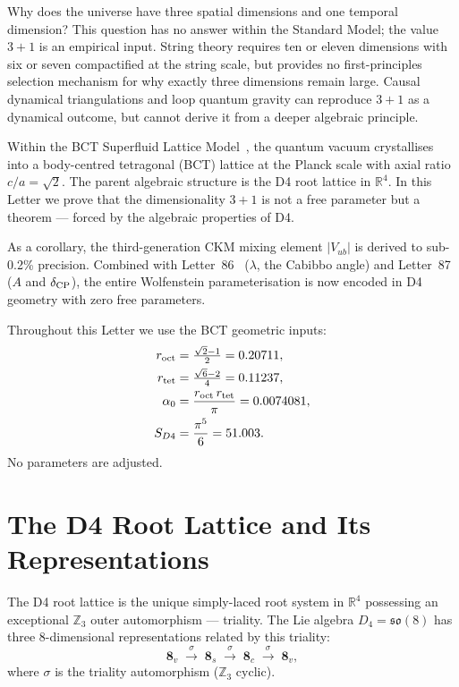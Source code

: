\documentclass[aps,prl,twocolumn,showpacs,superscriptaddress]{revtex4-2}
\begin{document}
Why does the universe have three spatial dimensions and one temporal
dimension? This question has no answer within the Standard Model; the
value $3+1$ is an empirical input. String theory requires ten or eleven
dimensions with six or seven compactified at the string scale, but
provides no first-principles selection mechanism for why exactly three
dimensions remain large. Causal dynamical triangulations and loop
quantum gravity can reproduce $3{+}1$ as a dynamical outcome, but
cannot derive it from a deeper algebraic principle.

Within the BCT Superfluid Lattice Model~\cite{BCT_monograph}, the
quantum vacuum crystallises into a body-centred tetragonal (BCT)
lattice at the Planck scale with axial ratio $c/a = \sqrt{2}$. The
parent algebraic structure is the D4 root lattice in $\mathbb{R}^4$.
In this Letter we prove that the dimensionality $3{+}1$ is not a free
parameter but a theorem --- forced by the algebraic properties of D4.

As a corollary, the third-generation CKM mixing element $|V_{ub}|$ is
derived to sub-0.2\% precision. Combined with Letter~86~\cite{L86}
($\lambda$, the Cabibbo angle) and Letter~87~\cite{L87} ($A$ and
$\delta_{\rm CP}$), the entire Wolfenstein parameterisation is now
encoded in D4 geometry with zero free parameters.

Throughout this Letter we use the BCT geometric inputs:
\begin{align}
  r_{\rm oct} &= \tfrac{\sqrt{2}-1}{2} = 0.20711, \label{eq:roct}\\
  r_{\rm tet} &= \tfrac{\sqrt{6}-2}{4} = 0.11237, \label{eq:rtet}\\
  \alpha_0    &= \frac{r_{\rm oct}\,r_{\rm tet}}{\pi} = 0.0074081,
  \label{eq:alpha0}\\
  S_{D4}      &= \frac{\pi^5}{6} = 51.003. \label{eq:SD4}
\end{align}
No parameters are adjusted.

\section{The D4 Root Lattice and Its Representations}

The D4 root lattice is the unique simply-laced root system in
$\mathbb{R}^4$ possessing an exceptional $\mathbb{Z}_3$ outer
automorphism --- triality. The Lie algebra $D_4 = \mathfrak{so}(8)$
has three 8-dimensional representations related by this triality:
\begin{equation}
  \mathbf{8}_v \;\xrightarrow{\;\sigma\;}\; \mathbf{8}_s
  \;\xrightarrow{\;\sigma\;}\; \mathbf{8}_c
  \;\xrightarrow{\;\sigma\;}\; \mathbf{8}_v,
  \label{eq:triality}
\end{equation}
where $\sigma$ is the triality automorphism ($\mathbb{Z}_3$ cyclic).
\end{document}
